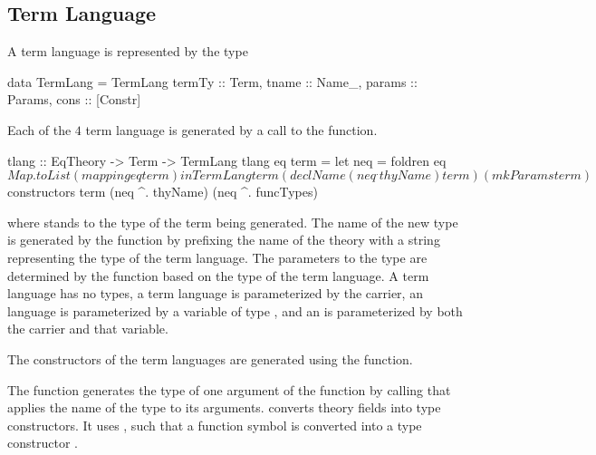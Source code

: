 \subsection{Term Language}
A term language is represented by the type 
\begin{hscode}
data TermLang = TermLang {
  termTy  :: Term,
  tname   :: Name_,
  params  :: Params,
  cons    :: [Constr] }
\end{hscode}
Each of the $4$ term language is generated by a call to the  function. 
\begin{hscode}
tlang :: EqTheory -> Term -> TermLang
tlang eq term =
  let neq = foldren eq $ Map.toList (mapping eq term) 
  in TermLang term (declName (neq ^. thyName) term) (mkParams term) $
             constructors term  (neq ^. thyName) (neq ^. funcTypes)
\end{hscode}
where  stands to the type of the term being generated. The name of the new type is generated by the function  by prefixing the name of the theory with a string representing the type of the term language. The parameters to the type are determined by the function  based on the type of the term language. A  term language has no types, a  term language is parameterized by the carrier, an  language is parameterized by a variable of type , and an  is parameterized by both the carrier and that  variable. 

The constructors of the term languages are generated using the  function. 
The function  generates the type of one argument of the function by calling  that applies the name of the type to its arguments.  converts theory fields into type constructors. It uses , such that a function symbol  is converted into a type constructor . 

